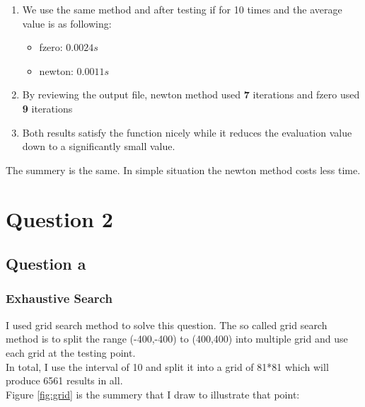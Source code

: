 \documentclass[11pt]{article}
\begin{document}
\begin{enumerate}

\item We use the same method and after testing if for 10 times and the average value is as following:
    \begin{itemize}
    \item fzero: $0.0024s$
    \item newton: $0.0011s$
    \end{itemize}
\item By reviewing the output file, newton method used \textbf 7 iterations and fzero used \textbf 9 iterations
\item Both results satisfy the function nicely while it reduces the evaluation value down to a significantly small value.
\end{enumerate}

The summery is the same. In simple situation the newton method costs less time.


\section{Question 2}

\subsection{Question a}

\subsubsection{Exhaustive Search}
I used grid search method to solve this question. The so called grid search method is to split the range (-400,-400) to (400,400) into multiple grid and use each grid at the testing point.\\
In total, I use the interval of 10 and split it into a grid of 81*81 which will produce 6561 results in all.\\

\FloatBarrier
Figure \ref{fig:grid} is the summery that I draw to illustrate that point:\\
\end{document}
